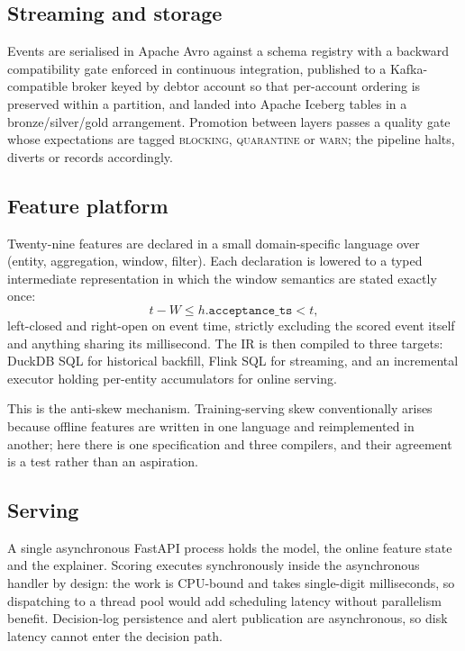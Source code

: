 \documentclass[conference]{IEEEtran}
\begin{document}
\subsection{Streaming and storage}

Events are serialised in Apache Avro against a schema registry with a backward
compatibility gate enforced in continuous integration, published to a
Kafka-compatible broker keyed by debtor account so that per-account ordering is
preserved within a partition, and landed into Apache Iceberg tables in a
bronze/silver/gold arrangement. Promotion between layers passes a quality gate
whose expectations are tagged \textsc{blocking}, \textsc{quarantine} or
\textsc{warn}; the pipeline halts, diverts or records accordingly.

\subsection{Feature platform}
\label{sec:features}

Twenty-nine features are declared in a small domain-specific language over
(entity, aggregation, window, filter). Each declaration is lowered to a typed
intermediate representation in which the window semantics are stated exactly
once:
\[
t - W \le h.\texttt{acceptance\_ts} < t,
\]
left-closed and right-open on event time, strictly excluding the scored event
itself and anything sharing its millisecond. The IR is then compiled to three
targets: DuckDB SQL for historical backfill, Flink SQL for streaming, and an
incremental executor holding per-entity accumulators for online serving.

This is the anti-skew mechanism. Training-serving skew conventionally arises
because offline features are written in one language and reimplemented in
another; here there is one specification and three compilers, and their
agreement is a test rather than an aspiration.

\subsection{Serving}

A single asynchronous FastAPI process holds the model, the online feature state
and the explainer. Scoring executes synchronously inside the asynchronous
handler by design: the work is CPU-bound and takes single-digit milliseconds, so
dispatching to a thread pool would add scheduling latency without parallelism
benefit. Decision-log persistence and alert publication are asynchronous, so
disk latency cannot enter the decision path.
\end{document}
